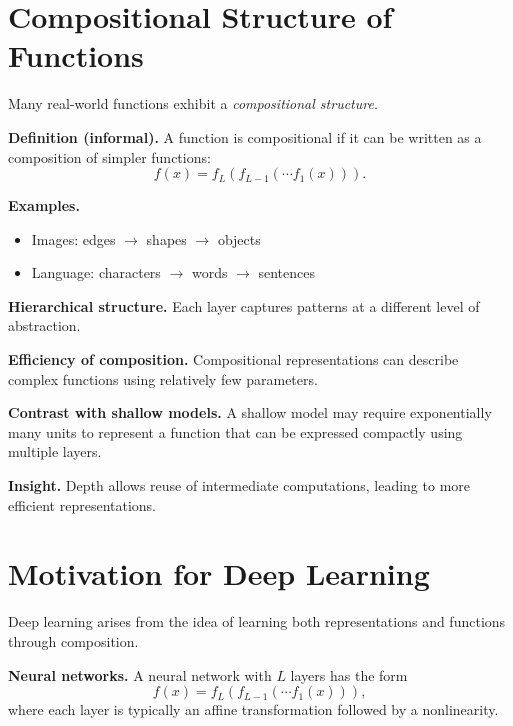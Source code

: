 \section{Compositional Structure of Functions}

Many real-world functions exhibit a \emph{compositional structure}.

\medskip

\noindent
\textbf{Definition (informal).}  
A function is compositional if it can be written as a composition of simpler functions:
\[
f(x) = f_L(f_{L-1}(\cdots f_1(x))).
\]

\medskip

\noindent
\textbf{Examples.}
\begin{itemize}
    \item Images: edges $\rightarrow$ shapes $\rightarrow$ objects
    \item Language: characters $\rightarrow$ words $\rightarrow$ sentences
\end{itemize}

\medskip

\noindent
\textbf{Hierarchical structure.}  
Each layer captures patterns at a different level of abstraction.

\medskip

\noindent
\textbf{Efficiency of composition.}  
Compositional representations can describe complex functions using relatively few parameters.

\medskip

\noindent
\textbf{Contrast with shallow models.}  
A shallow model may require exponentially many units to represent a function that can be expressed compactly using multiple layers.

\medskip

\noindent
\textbf{Insight.}  
Depth allows reuse of intermediate computations, leading to more efficient representations.

\section{Motivation for Deep Learning}

Deep learning arises from the idea of learning both representations and functions through composition.

\medskip

\noindent
\textbf{Neural networks.}  
A neural network with $L$ layers has the form
\[
f(x) = f_L(f_{L-1}(\cdots f_1(x))),
\]
where each layer is typically an affine transformation followed by a nonlinearity.

